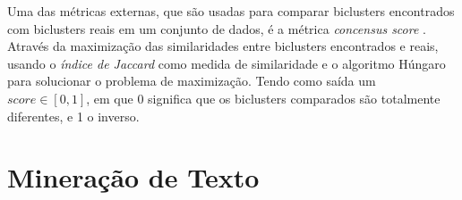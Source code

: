 \documentclass[normaltoc, espacoumemeio, pnumromarab,ruledheader]{abnt}
\begin{document}
Uma das métricas externas, que são usadas para comparar biclusters encontrados com biclusters reais em um conjunto de dados, é a métrica \textit{concensus score} \cite{Hochreiter2010}. Através da maximização das similaridades entre biclusters encontrados e reais, usando o \textit{índice de Jaccard} como medida de similaridade e o algoritmo Húngaro para solucionar o problema de maximização. Tendo como saída um $\textit{score} \in [0,1]$, em que 0 significa que os biclusters comparados são totalmente diferentes, e 1 o inverso.




        
\section{Mineração de Texto}
\label{sec:mintexto}
\end{document}
